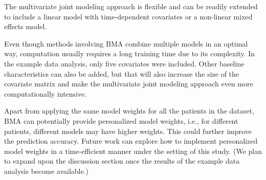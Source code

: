 The multivariate joint modeling approach is flexible and can be readily extended to include a linear model with time-dependent covariates or a non-linear mixed effects model. 

Even though methods involving \ac{BMA} combine multiple models in an optimal way, computation usually requires a long training time due to its complexity. In the example data analysis, only five covariates were included. Other baseline characteristics can also be added, but that will also increase the size of the covariate matrix and make the multivariate joint modeling approach even more computationally intensive. 

Apart from applying the same model weights for all the patients in the dataset, \ac{BMA} can potentially provide personalized model weights, i.e., for different patients, different models may have higher weights. This could further improve the prediction accuracy. Future work can explore how to implement personalized model weights in a time-efficient manner under the setting of this study. (We plan to expand upon the discussion section once the results of the example data analysis become available.)
